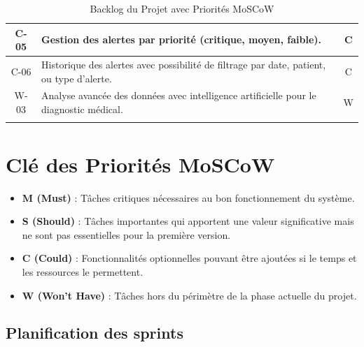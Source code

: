 \begin{longtable}{|c|p{9cm}|c|}
    \hline
    C-05 & Gestion des alertes par priorité (critique, moyen, faible). & C \\
    \hline
    C-06 & Historique des alertes avec possibilité de filtrage par date, patient, ou type d’alerte. & C \\
    \hline
    W-03 & Analyse avancée des données avec intelligence artificielle pour le diagnostic médical. &W \\
    \hline
\caption{Backlog du Projet avec Priorités MoSCoW} 
\label{tab:backlog_moscow}
\end{longtable}
\section*{Clé des Priorités MoSCoW}
\begin{itemize}
    \item \textbf{M (Must)} : Tâches critiques nécessaires au bon fonctionnement du système.
    \item \textbf{S (Should)} : Tâches importantes qui apportent une valeur significative mais ne sont pas essentielles pour la première version.
    \item \textbf{C (Could)} : Fonctionnalités optionnelles pouvant être ajoutées si le temps et les ressources le permettent.
    \item \textbf{W (Won't Have)} : Tâches hors du périmètre de la phase actuelle du projet.
\end{itemize}

%  
\subsection{Planification des sprints}
 
%  

